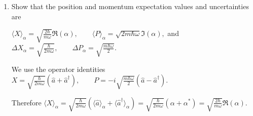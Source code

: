 \documentclass[11pt,a4paper]{scrartcl}
\begin{document}
\begin{enumerate}[label=(\alph*)]
    \begin{calculationbox}
    Since
    $
    \hat H = \hbar\omega\left(\hat N+\frac12\right),
    \qquad \hat N=\hat a^\dagger \hat a,
    $
    it is enough to compute the moments of $\hat N$.

    Because $\hat a\phi_\alpha=\alpha\phi_\alpha$, we get $\langle \hat N\rangle_\alpha = \langle \phi_\alpha|\hat a^\dagger\hat a|\phi_\alpha\rangle = \langle \hat a\phi_\alpha|\hat a\phi_\alpha\rangle = |\alpha|^2$.
    
    So
    $
    \langle H\rangle_\alpha
    = \hbar\omega\left(\langle \hat N\rangle_\alpha+\frac12\right)
    = \hbar\omega\left(|\alpha|^2+\frac12\right).
    $

    Next,
    $
    \Delta H_\alpha = \hbar\omega\,\Delta N_\alpha.
    $
    So we compute
    $
    \Delta N_\alpha^2 = \langle \hat N^2\rangle_\alpha - \langle \hat N\rangle_\alpha^2.
    $
    Since the number distribution is Poisson with parameter $|\alpha|^2$, its variance is also $|\alpha|^2$. Therefore
    $
    \Delta N_\alpha^2 = |\alpha|^2
    \qquad \Rightarrow \qquad
    \Delta N_\alpha = |\alpha|.
    $
    So
    $\Delta H_\alpha = \hbar\omega |\alpha|.
    $

    The relative energy fluctuation behaves as
    $
    \frac{\Delta H_\alpha}{\langle H\rangle_\alpha}
    = \frac{|\alpha|}{|\alpha|^2+\frac12}
    \sim \frac{1}{|\alpha|}
    \qquad (|\alpha|\gg 1),
    $
    so it vanishes in the quasi-classical limit.
    \end{calculationbox}

  

    \item  Show that the position and momentum expectation values and uncertainties are

    $
    \langle X\rangle_\alpha = \sqrt{\frac{2\hbar}{m\omega}}\Re(\alpha),
    \qquad
    \langle P\rangle_\alpha = \sqrt{2m\hbar\omega}\Im(\alpha),
    $
    and
    $
    \Delta X_\alpha=\sqrt{\frac{\hbar}{2m\omega}},
    \qquad
    \Delta P_\alpha=\sqrt{\frac{m\hbar\omega}{2}}.
    $

    \begin{calculationbox}
    We use the operator identities
    $
    X=\sqrt{\frac{\hbar}{2m\omega}}(\hat a+\hat a^\dagger),
    \qquad
    P=-i\sqrt{\frac{m\hbar\omega}{2}}(\hat a-\hat a^\dagger).
    $

    Therefore $\langle X\rangle_\alpha = \sqrt{\frac{\hbar}{2m\omega}} \left(\langle \hat a\rangle_\alpha + \langle \hat a^\dagger\rangle_\alpha\right) = \sqrt{\frac{\hbar}{2m\omega}}(\alpha+\alpha^*) = \sqrt{\frac{2\hbar}{m\omega}}\Re(\alpha)$.


\end{calculationbox}
\end{enumerate}
\end{document}
